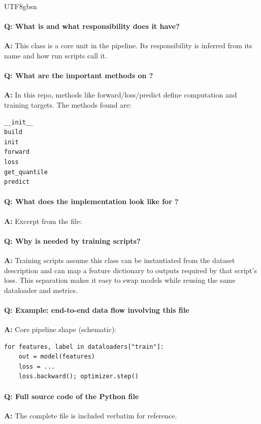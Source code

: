 \documentclass[11pt]{article}
\begin{document}
\begin{CJK*}{UTF8}{gbsn}
\vspace{1mm}


\paragraph{Q: What is \texttt{} and what responsibility does it have?}
\textbf{A:} This class is a core unit in the pipeline. Its responsibility is inferred from its name and how run scripts call it.

\paragraph{Q: What are the important methods on \texttt{}?}
\textbf{A:} In this repo, methods like forward/loss/predict define computation and training targets. The methods found are:

\begin{Verbatim}[fontsize=\small]
__init__
build
init
forward
loss
get_quantile
predict
\end{Verbatim}

\paragraph{Q: What does the implementation look like for \texttt{}?}
\textbf{A:} Excerpt from the file:

\vspace{1mm}


\paragraph{Q: Why is \texttt{} needed by training scripts?}
\textbf{A:} Training scripts assume this class can be instantiated from the dataset description and can map a feature dictionary to outputs required by that script's loss. This separation makes it easy to swap models while reusing the same dataloader and metrics.

\paragraph{Q: Example: end-to-end data flow involving this file}
\textbf{A:} Core pipeline shape (schematic):

\begin{Verbatim}[fontsize=\small]
for features, label in dataloaders["train"]:
    out = model(features)
    loss = ...
    loss.backward(); optimizer.step()
\end{Verbatim}

\paragraph{Q: Full source code of the Python file}
\textbf{A:} The complete file is included verbatim for reference.


\end{CJK*}
\end{document}
